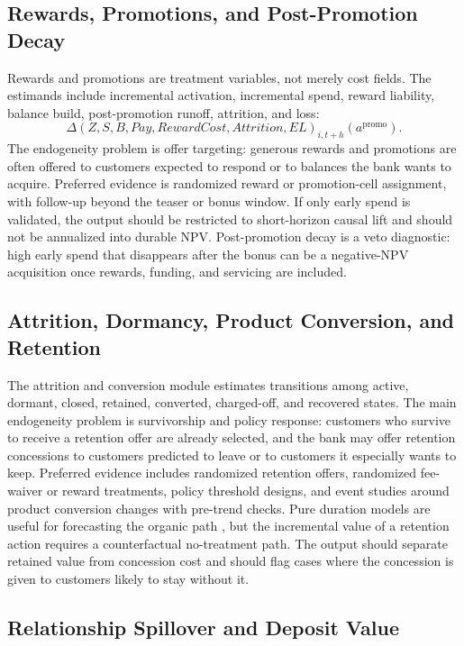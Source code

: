 \documentclass[11pt]{article}
\newcommand{\1}{\mathbf{1}}
\begin{document}
\subsection*{Rewards, Promotions, and Post-Promotion Decay}

Rewards and promotions are treatment variables, not merely cost fields. The
estimands include incremental activation, incremental spend, reward liability,
balance build, post-promotion runoff, attrition, and loss:
\[
  \Delta (Z,S,B,Pay,RewardCost,Attrition,EL)_{i,t+h}(a^{\mathrm{promo}}).
\]
The endogeneity problem is offer targeting: generous rewards and promotions
are often offered to customers expected to respond or to balances the bank
wants to acquire. Preferred evidence is randomized reward or promotion-cell
assignment, with follow-up beyond the teaser or bonus window. If only early
spend is validated, the output should be restricted to short-horizon causal
lift and should not be annualized into durable NPV. Post-promotion decay is a
veto diagnostic: high early spend that disappears after the bonus can be a
negative-NPV acquisition once rewards, funding, and servicing are included.

\subsection*{Attrition, Dormancy, Product Conversion, and Retention}

The attrition and conversion module estimates transitions among active,
dormant, closed, retained, converted, charged-off, and recovered states. The
main endogeneity problem is survivorship and policy response: customers who
survive to receive a retention offer are already selected, and the bank may
offer retention concessions to customers predicted to leave or to customers it
especially wants to keep. Preferred evidence includes randomized retention
offers, randomized fee-waiver or reward treatments, policy threshold designs,
and event studies around product conversion changes with pre-trend checks.
Pure duration models are useful for forecasting the organic path
\citep{schmittlein1987counting,fader2005bgnbd,bolton1998duration}, but the
incremental value of a retention action requires a counterfactual no-treatment
path. The output should separate retained value from concession cost and
should flag cases where the concession is given to customers likely to stay
without it.

\subsection*{Relationship Spillover and Deposit Value}
\end{document}
